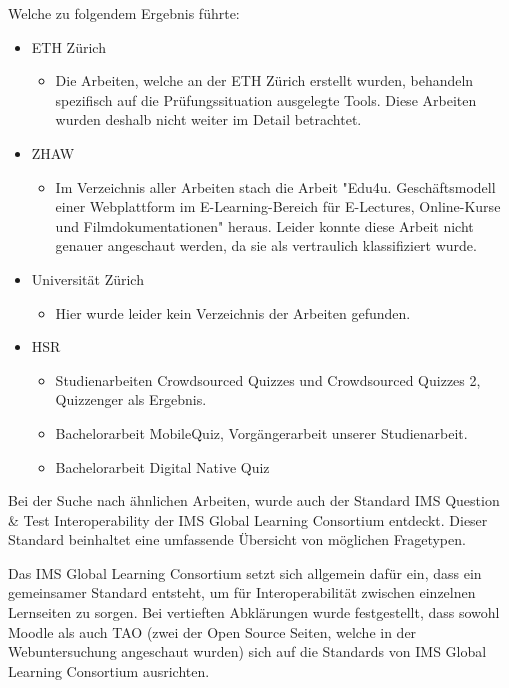 Welche zu folgendem Ergebnis führte:
\begin{itemize}
	\item ETH Zürich
	\begin{itemize}
		\item Die Arbeiten, welche an der ETH Zürich erstellt wurden, behandeln spezifisch auf die Prüfungssituation ausgelegte Tools. Diese Arbeiten wurden deshalb nicht weiter im Detail betrachtet. 
	\end{itemize}
	\item ZHAW
	\begin{itemize}
		\item Im Verzeichnis aller Arbeiten stach die Arbeit "Edu4u. Geschäftsmodell einer Webplattform im E-Learning-Bereich für E-Lectures, Online-Kurse und Filmdokumentationen" heraus. Leider konnte diese Arbeit nicht genauer angeschaut werden, da sie als vertraulich klassifiziert wurde.
	\end{itemize}
	\item Universität Zürich
	\begin{itemize}
		\item Hier wurde leider kein Verzeichnis der Arbeiten gefunden.
	\end{itemize}
	\item HSR
	\begin{itemize}
		\item Studienarbeiten Crowdsourced Quizzes und Crowdsourced Quizzes 2, Quizzenger als Ergebnis.
		\item Bachelorarbeit MobileQuiz, Vorgängerarbeit unserer Studienarbeit.
		\item Bachelorarbeit Digital Native Quiz
	\end{itemize}
\end{itemize}

Bei der Suche nach ähnlichen Arbeiten, wurde auch der Standard \glqq IMS Question \& Test Interoperability\grqq \cite{imsglobal.org} der IMS Global Learning Consortium entdeckt. Dieser Standard beinhaltet eine umfassende Übersicht von möglichen Fragetypen.

Das IMS Global Learning Consortium setzt sich allgemein dafür ein, dass ein gemeinsamer Standard entsteht, um für Interoperabilität zwischen einzelnen Lernseiten zu sorgen. Bei vertieften Abklärungen wurde festgestellt, dass sowohl Moodle als auch TAO (zwei der Open Source Seiten, welche in der Webuntersuchung angeschaut wurden) sich auf die Standards von IMS Global Learning Consortium ausrichten.

